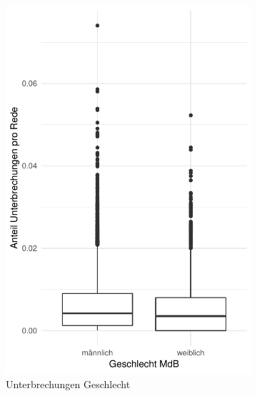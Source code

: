 \documentclass[12pt, 
    twoside=false, 
    bibliography=totoc, 
    numbers=endperiod, 
    headings=normal, 
    toc=chapterentrydotfill
    ]{scrbook}
\begin{document}
\begin{figure}[H]
    \centering
    \begin{subfigure}{.5\textwidth}
      \centering
      \includegraphics[width=.9\linewidth]{document/images/boxplot_unterbrechung_geschlecht.pdf}
      \caption{Unterbrechungen Geschlecht}
      \label{fig:boxplot_unterbrechung_geschlecht}
    \end{subfigure}%
    \begin{subfigure}{.5\textwidth}
      \centering

\end{subfigure}
\end{figure}
\end{document}
